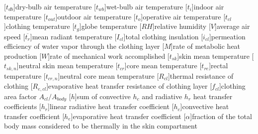 
\renewcommand{\baselinestretch}{0.75}\normalsize
\renewcommand{\aclabelfont}[1]{\textsc{\acsfont{#1}}}
\begin{acronym}[longest]

    [$t_{db}$]{dry-bulb air temperature}
    [$t_{wb}$]{wet-bulb air temperature}
    [$t_{i}$]{indoor air temperature}
    [$t_{out}$]{outdoor air temperature}
    [$t_{o}$]{operative air temperature}
    [$t_{cl}$]{clothing temperature}
    [$t_{g}$]{globe temperature}
    [$RH$]{relative humidity\acroextra{, \%}}
    [$V$]{average air speed}
    [$\overline{t_{r}}$]{mean radiant temperature}
    [$I_{cl}$]{total clothing insulation}
    [$i_{cl}$]{permeation efficiency of water vapor through the clothing layer}
    [$M$]{rate of metabolic heat production}
    [$W$]{rate of mechanical work accomplished}
    [$t_{sk}$]{skin mean temperature}
    [$t_{sk,n}$]{neutral skin mean temperature}
    [$t_{cr}$]{core mean temperature}
    [$t_{re}$]{rectal temperature}
    [$t_{cr,n}$]{neutral core mean temperature}
    [$R_{cl}$]{thermal resistance of clothing}
    [$R_{e,cl}$]{evaporative heat transfer resistance of clothing layer}
    [$f_{cl}$]{clothing area factor $A_{cl}/A_{body}$}
    [$h$]{sum of convective $h_{c}$ and radiative $h_{r}$ heat transfer coefficients}
    [$h_{r}$]{linear radiative heat transfer coefficient}
    [$h_{c}$]{convective heat transfer coefficient}
    [$h_{e}$]{evaporative heat transfer coefficient}
    [$\alpha$]{fraction of the total body mass considered
to be thermally in the skin compartment}


\end{acronym}
